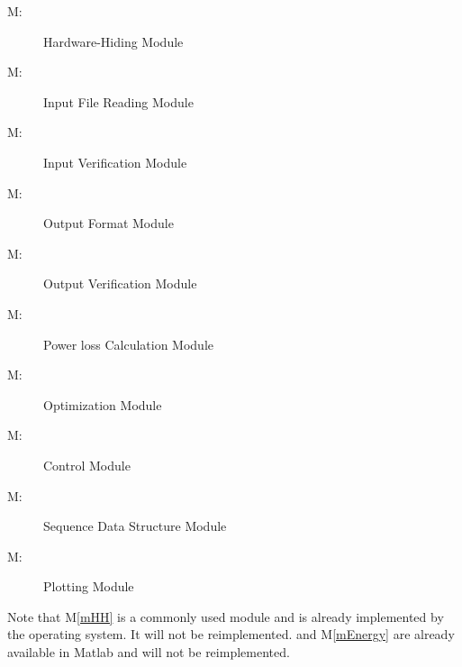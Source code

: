 \documentclass[12pt]{article}
\newcounter{mnum}
\newcommand{\mthemnum}{M\themnum}
\newcommand{\mref}[1]{M\ref{#1}}
\begin{document}
\begin{description}
\item [ \mthemnum \label{mHH}:] Hardware-Hiding Module
\item [ \mthemnum \label{mParams}:] Input File Reading Module
\item [ \mthemnum \label{mVerify}:] Input Verification Module
\item [ \mthemnum \label{mOutput}:] Output Format Module
\item [ \mthemnum \label{mVerifyOut}:] Output Verification Module
\item [ \mthemnum \label{mODEs}:] Power loss Calculation Module
\item [ \mthemnum \label{mEnergy}:]  Optimization Module
\item [ \mthemnum \label{mControl}:] Control Module
\item [ \mthemnum \label{mSeqDS}:] Sequence Data Structure Module
\item [ \mthemnum \label{mPlot}:] Plotting Module
\end{description}

Note that \mref{mHH} is a commonly used module and is already implemented by the operating
system.  It will not be reimplemented.  and \mref{mEnergy} are already available in Matlab and will not be reimplemented.
\end{document}
